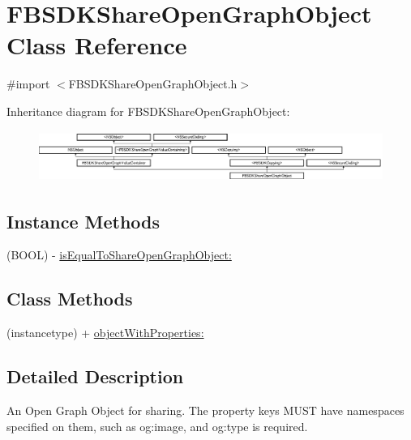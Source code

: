 \hypertarget{interface_f_b_s_d_k_share_open_graph_object}{}\section{F\+B\+S\+D\+K\+Share\+Open\+Graph\+Object Class Reference}
\label{interface_f_b_s_d_k_share_open_graph_object}


{\ttfamily \#import $<$F\+B\+S\+D\+K\+Share\+Open\+Graph\+Object.\+h$>$}

Inheritance diagram for F\+B\+S\+D\+K\+Share\+Open\+Graph\+Object\+:\begin{figure}[H]
\begin{center}
\leavevmode
\includegraphics[height=1.671642cm]{interface_f_b_s_d_k_share_open_graph_object}
\end{center}
\end{figure}
\subsection*{Instance Methods}
\begin{DoxyCompactItemize}
\item 
(B\+O\+O\+L) -\/ \hyperlink{interface_f_b_s_d_k_share_open_graph_object_a37c41cf21bbb6f1644d988b8ebe8c123}{is\+Equal\+To\+Share\+Open\+Graph\+Object\+:}
\end{DoxyCompactItemize}
\subsection*{Class Methods}
\begin{DoxyCompactItemize}
\item 
(instancetype) + \hyperlink{interface_f_b_s_d_k_share_open_graph_object_a89a8b7be998e2e65e4e2a31ce278c8c1}{object\+With\+Properties\+:}
\end{DoxyCompactItemize}


\subsection{Detailed Description}
An Open Graph Object for sharing.  The property keys M\+U\+S\+T have namespaces specified on them, such as {\ttfamily og\+:image}, and {\ttfamily og\+:type} is required.

